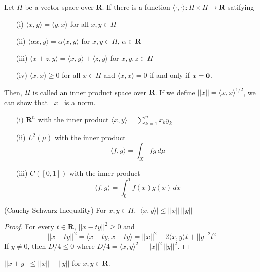 \vspace{2ex}
\begin{defi}
Let $H$ be a vector space over ${\bm R}$. If there is a function $\langle \cdot ,\cdot \rangle :H\times H\rightarrow {\bm R}$ satifying
\begin{itemize}
\item[(i)] $\langle x,y\rangle =\langle y,x\rangle $ for all $x,y\in H$
\item[(ii)] $\langle \alpha x,y\rangle =\alpha \langle x,y\rangle $ for $x,y\in H$, $\alpha \in {\bm R}$
\item[(iii)] $\langle x+z,y\rangle =\langle x,y\rangle +\langle z,y\rangle $ for $x,y,z\in H$
\item[(iv)] $\langle x,x\rangle \geq 0$ for all $x\in H$ and $\langle x,x\rangle =0$ if and only if $x={\bf 0}$.
\end{itemize}
Then, $H$ is called an inner product space over ${\bm R}$. If we define $||x||=\langle x,x\rangle ^{1/2}$, we can show that $||x||$ is a norm. 
\end{defi}
\vspace{2ex}
\begin{ex}
\begin{itemize}
\item[(i)] ${\bm R}^{n}$ with the inner product $\langle x,y\rangle =\sum _{k=1}^{n}x_{k}y_{k}$
\item[(ii)] $L^{2}(\mu )$ with the inner product 
\[\langle f,g\rangle =\int _{X}fg\,d \mu \]
\item[(iii)] $C([0,1])$ with the inner product
\[\langle f,g\rangle =\int ^{1}_{0}f(x)g(x)\,d x\]
\end{itemize}
\end{ex}
\vspace{2ex}
\begin{thm}
(Cauchy-Schwarz Inequality) For $x,y\in H$, $|\langle x,y\rangle |\leq ||x||\,||y||$ 
\end{thm}
\vspace{2ex}
\begin{proof}
For every $t\in {\bm R}$, $||x-ty||^2\geq 0$ and 
\[||x-ty||^2=\langle x-ty,x-ty\rangle =||x||^2-2\langle x,y\rangle t+||y||^2t^2\]
If $y\ne 0$, then $D/4\leq 0$ where $D/4=\langle x,y\rangle ^2-||x||^2\,||y||^2$. 
\end{proof}
\vspace{2ex}
\begin{cor}
$||x+y||\leq ||x||+||y||$ for $x,y\in {\bm R}$. 
\end{cor}
\vspace{2ex}
